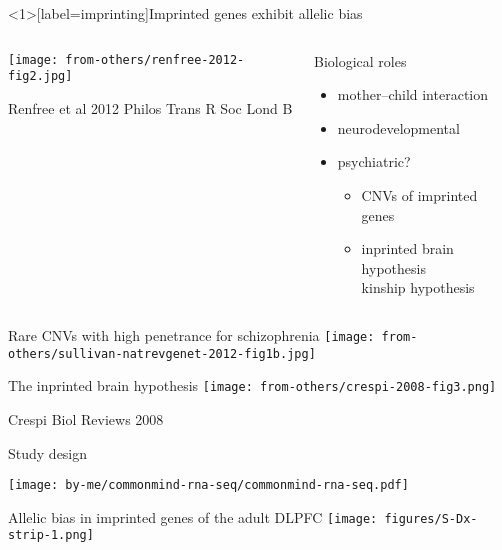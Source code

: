 \documentclass[usenames,dvipsnames]{beamer}
\begin{document}
\begin{frame}<1>[label=imprinting]{Imprinted genes exhibit allelic bias}
\begin{columns}[t]
\begin{column}{0.5\textwidth}

\texttt{[image: from-others/renfree-2012-fig2.jpg]}

{\tiny Renfree et al 2012 Philos Trans R Soc Lond B}
\end{column}
\begin{column}{0.5\textwidth}
Biological roles
\begin{itemize}
\item mother--child interaction
\item neurodevelopmental 
\item psychiatric?
\begin{itemize}
\item CNVs of imprinted genes
\item<2> inprinted brain hypothesis\\
kinship hypothesis
\end{itemize}
\end{itemize}
\end{column}
\end{columns}
\end{frame}

\begin{frame}{Rare CNVs with high penetrance for schizophrenia}
\texttt{[image: from-others/sullivan-natrevgenet-2012-fig1b.jpg]}
\end{frame}


\begin{frame}{The inprinted brain hypothesis}
\texttt{[image: from-others/crespi-2008-fig3.png]}

\tiny Crespi Biol Reviews 2008
\end{frame}

\begin{frame}{Study design}

\texttt{[image: by-me/commonmind-rna-seq/commonmind-rna-seq.pdf]}
\end{frame}

\begin{frame}{Allelic bias in imprinted genes of the adult DLPFC}
\texttt{[image: figures/S-Dx-strip-1.png]}
\end{frame}
\end{document}
